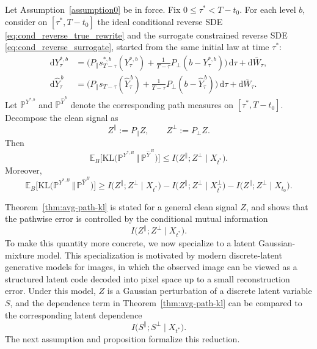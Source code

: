 \documentclass[twoside,11pt]{article}
\newcommand{\E}{\mathbb{E}}
\newcommand{\PP}{\mathbb{P}}
\newcommand{\dd}{\mathrm{d}}
\newcommand{\KL}{\mathrm{KL}}
\numberwithin{equation}{section}
\begin{document}
\begin{theorem}
\label{thm:avg-path-kl}
Let Assumption~\ref{assumption0} be in force. Fix \(0\le \tau^*<T-t_0\). For each level
\(b\), consider on \([\tau^*,T-t_0]\) the ideal conditional reverse SDE
\eqref{eq:cond_reverse_true_rewrite} and the surrogate constrained reverse SDE
\eqref{eq:cond_reverse_surrogate}, started from the same initial law at time \(\tau^*\):
\[
\begin{aligned}
\dd Y_\tau^{*,b}
&=
\Big(
P_{\parallel}s_{T-\tau}^{*,b}(Y_\tau^{*,b})
+\frac{1}{T-\tau}P_{\perp}(b-Y_\tau^{*,b})
\Big)\,\dd\tau
+\dd\bar W_\tau,\\[4pt]
\dd \hat Y_\tau^{\,b}
&=
\Big(
P_{\parallel}s_{T-\tau}(\hat Y_\tau^{\,b})
+\frac{1}{T-\tau}P_{\perp}(b-\hat Y_\tau^{\,b})
\Big)\,\dd\tau
+\dd\bar W_\tau.
\end{aligned}
\]
Let \(\PP^{Y^{*,b}}\) and \(\PP^{\hat Y^{\,b}}\) denote the corresponding path measures on
\([\tau^*,T-t_0]\). Decompose the clean signal as
\[
Z^\parallel:=P_\parallel Z,
\qquad
Z^\perp:=P_\perp Z.
\]
Then
\[
\E_B\!\Big[\KL\!\big(\PP^{Y^{*,B}}\,\Vert\,\PP^{\hat Y^{\,B}}\big)\Big]
\le
I\!\big(Z^\parallel;Z^\perp\mid X_{t^*}\big).
\]
Moreover,
\[
\E_B\!\Big[\KL\!\big(\PP^{Y^{*,B}}\,\Vert\,\PP^{\hat Y^{\,B}}\big)\Big]
\ge
I\!\big(Z^\parallel;Z^\perp\mid X_{t^*}\big)
-
I\!\big(Z^\parallel;Z^\perp\mid X_{t^*}^\perp\big)
-
I\!\big(Z^\parallel;Z^\perp\mid X_{t_0}\big).
\]
\end{theorem}
Theorem~\ref{thm:avg-path-kl} is stated for a general clean signal \(Z\), and shows that the
pathwise error is controlled by the conditional mutual information
\[
I\!\big(Z^\parallel;Z^\perp\mid X_{t^*}\big).
\]
To make this quantity more concrete, we now specialize to a latent Gaussian-mixture model.
This specialization is motivated by modern discrete-latent generative models for images, in
which the observed image can be viewed as a structured latent code decoded into pixel space
up to a small reconstruction error. Under this model, \(Z\) is a Gaussian perturbation of a
discrete latent variable \(S\), and the dependence term in Theorem~\ref{thm:avg-path-kl}
can be compared to the corresponding latent dependence
\[
I\!\big(S^\parallel;S^\perp\mid X_{t^*}\big).
\]
The next assumption and proposition formalize this reduction.
\end{document}
